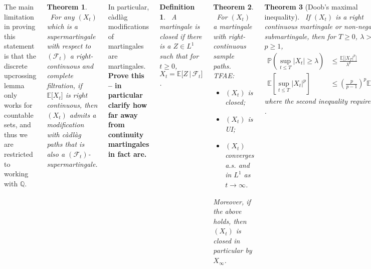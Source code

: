 \documentclass{tikzposter} %
\newtheorem{theorem}{Theorem}
\newtheorem{definition}{Definition}
\begin{document}
\begin{columns}
{{      The main limitation in proving this statement is that the discrete upcrossing lemma only works for countable sets, and thus we are restricted to working with $\mathbb{Q}$. \\

      \begin{theorem}
      \ For any $(X_{t})$ which is a supermartingale with respect to $(\mathcal{F}_{t})$ a right-continuous and complete filtration, if $\mathbb{E}\big[X_{t}\big]$ is right continuous, then $(X_{t})$ admits a modification with c\`adl\`ag paths that is also a $(\mathcal{F}_{t})$-supermartingale.
      \end{theorem}
      \hphantom{}

      In particular, c\`adl\`ag modifications of martingales are martingales. \\

      \textbf{Prove this -- in particular clarify how far away from continuity martingales in fact are.} \\

      \begin{definition}
      \ A martingale is closed if there is a $Z \in L^{1}$ such that for $t \ge 0$, $X_{t} = \mathbb{E}\big[Z \,|\, \mathcal{F}_{t}\big]$.
      \end{definition}
      \hphantom{}

      \begin{theorem}
      \ For $(X_{t})$ a martingale with right-continuous sample paths. TFAE:
      \begin{itemize}
              \item $(X_{t})$ is closed;
              \item $(X_{t})$ is UI;
              \item $(X_{t})$ converges a.s. and in $L^{1}$ as $t \to \infty$.
      \end{itemize}
      Moreover, if the above holds, then $(X_{t})$ is closed in particular by $X_{\infty}$.
      \end{theorem}
      \hphantom{}
    }
    \hphantom{}

    \begin{theorem}[Doob's maximal inequality]
      \ If $(X_{t})$ is a right continuous martingale or non-negative submartingale, then for $T \ge 0$, $\lambda > 0$, $p \ge 1$,
      \begin{align*}
        \mathbb{P}\left(\sup_{t \le T} |X_{t}| \ge \lambda\right) &\le \frac{\mathbb{E}\big[|X_{T}|^{p}\big]}{\lambda^{p}} \\
        \mathbb{E}\left[\sup_{t \le T} |X_{t}|^{p}\right] &\le \left(\frac{p}{p-1}\right)^{p} \mathbb{E}\big[|X_{T}|^{p}\big]
      \end{align*}
      where the second inequality requires $p > 1$.
    \end{theorem}
    \hphantom{}

}
\end{columns}
\end{document}
